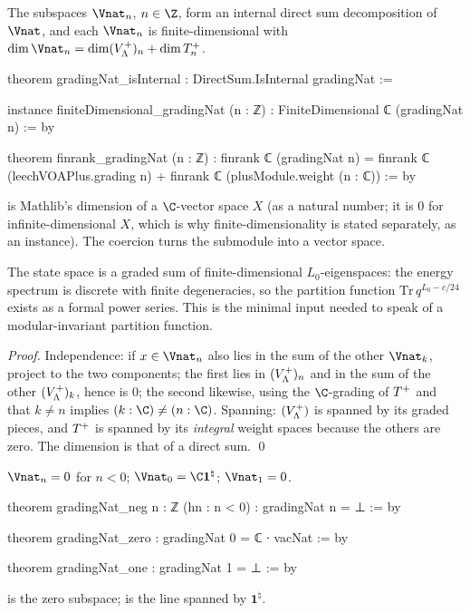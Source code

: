 \begin{theorem}[$\Vnat=\bigoplus_n\Vnat_n$]\label{ch10:thm:internal}
The subspaces $\Vnat_n$, $n\in\Z$, form an internal direct sum decomposition of $\Vnat$, and each
$\Vnat_n$ is finite-dimensional with $\dim\Vnat_n=\dim(\chtenVP)_n+\dim\chtenTP_n$.
\end{theorem}
\begin{leancode}
theorem gradingNat_isInternal : DirectSum.IsInternal gradingNat :=

instance finiteDimensional_gradingNat (n : ℤ) : FiniteDimensional ℂ (gradingNat n) := by

theorem finrank_gradingNat (n : ℤ) :
    finrank ℂ (gradingNat n)
      = finrank ℂ (leechVOAPlus.grading n) + finrank ℂ (plusModule.weight (n : ℂ)) := by
\end{leancode}
\begin{dictionary}
 is Mathlib's dimension of a $\C$-vector space $X$ (as a natural number; it is
$0$ for infinite-dimensional $X$, which is why finite-dimensionality is stated separately, as an
instance).  The coercion turns the submodule  into a vector space.
\end{dictionary}

\begin{physics}
The state space is a graded sum of finite-dimensional $L_0$-eigenspaces: the energy spectrum is discrete with finite degeneracies, so the partition function $\mathrm{Tr}\,q^{L_0-c/24}$ exists as a formal power series. This is the minimal input needed to speak of a modular-invariant partition function.
\end{physics}

\emph{Proof.}  Independence: if $x\in\Vnat_n$ also lies in the sum of the other $\Vnat_k$, project
to the two components; the first lies in $(V_{\Lambda}^{+})_n$ and in the sum of the other
$(V_{\Lambda}^{+})_k$, hence is $0$; the second likewise, using the $\C$-grading of $T^{+}$ and that
$k\ne n$ implies $(k:\C)\ne(n:\C)$.  Spanning: $(V_{\Lambda}^{+})$ is spanned by its graded pieces, and
$T^{+}$ is spanned by its \emph{integral} weight spaces because the others are zero.  The
dimension is that of a direct sum. \qed

\begin{theorem}\label{ch10:thm:lowweights}
$\Vnat_n=0$ for $n<0$; $\Vnat_0=\C\mathbf1^\natural$; $\Vnat_1=0$.
\end{theorem}
\begin{leancode}
theorem gradingNat_neg {n : ℤ} (hn : n < 0) : gradingNat n = ⊥ := by

theorem gradingNat_zero : gradingNat 0 = ℂ ∙ vacNat := by

theorem gradingNat_one : gradingNat 1 = ⊥ := by
\end{leancode}
\begin{dictionary}
 is the zero subspace;  is the line spanned by $\mathbf1^\natural$.
\end{dictionary}

